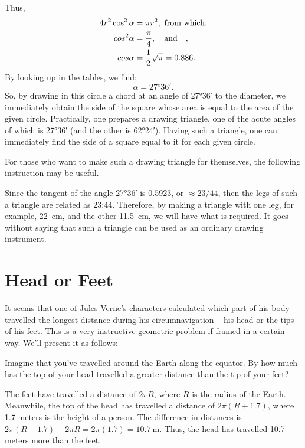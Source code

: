 Thus,
\begin{align*}%
4r^{2} \cos^{2} \alpha & = \pi r^{2}, \,\, \text{from which,}\\
cos^{2} \alpha & = \frac{\pi}{4}, \qand , \\
cos \alpha & = \frac{1}{2} \sqrt{\pi} = 0.886.
\end{align*}
By looking up in the tables, we find:
\begin{equation*}%
\alpha = \ang{27;36}.
\end{equation*}
So, by drawing in this circle a chord at an angle of \ang{27;36} to the diameter, we immediately obtain the side of the square whose area is equal to the area of the given circle. Practically, one prepares a drawing triangle, one of the acute angles of which is \ang{27;36} (and the other is \ang{62;24}). Having such a triangle, one can immediately find the side of a square equal to it for each given circle.

For those who want to make such a drawing triangle for themselves, the following instruction may be useful.

Since the tangent of the angle \ang{27;36} is 0.5923, or $\approx 23/44$, then the legs of such a triangle are related as 23:44. Therefore, by making a triangle with one leg, for example, \SI{22}{\centi\meter}, and the other \SI{11.5}{\centi\meter}, we will have what is required. It goes without saying that such a triangle can be used as an ordinary drawing instrument.


\section{Head or Feet}
\label{sec-9.8}

It seems that one of Jules Verne's characters calculated which part of his body travelled the longest distance during his circumnavigation -- his head or the tips of his feet. This is a very instructive geometric problem if framed in a certain way. We'll present it as follows:


\ques Imagine that you've travelled around the Earth along the equator. By how much has the top of your head travelled a greater distance than the tip of your feet?


\ans The feet have travelled a distance of $2\pi R$, where $R$ is the radius of the Earth. Meanwhile, the top of the head has travelled a distance of $2\pi(R + 1.7)$, where 1.7 meters is the height of a person. The difference in distances is $2\pi(R + 1.7) - 2\pi R = 2\pi(1.7) = \SI{10.7}{\meter}$. Thus, the head has travelled 10.7 meters more than the feet.

